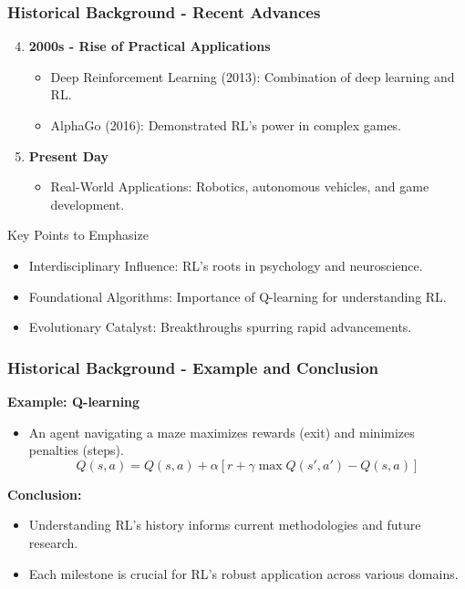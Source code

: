 \documentclass[aspectratio=169]{beamer}
\begin{document}
\begin{frame}[fragile]
    \frametitle{Historical Background - Recent Advances}
    \begin{enumerate}
        \setcounter{enumi}{3}
        \item \textbf{2000s - Rise of Practical Applications}
            \begin{itemize}
                \item Deep Reinforcement Learning (2013): Combination of deep learning and RL.
                \item AlphaGo (2016): Demonstrated RL's power in complex games.
            \end{itemize}
        
        \item \textbf{Present Day}
            \begin{itemize}
                \item Real-World Applications: Robotics, autonomous vehicles, and game development.
            \end{itemize}
    \end{enumerate}
    \begin{block}{Key Points to Emphasize}
        \begin{itemize}
            \item Interdisciplinary Influence: RL's roots in psychology and neuroscience.
            \item Foundational Algorithms: Importance of Q-learning for understanding RL.
            \item Evolutionary Catalyst: Breakthroughs spurring rapid advancements.
        \end{itemize}
    \end{block}
\end{frame}

\begin{frame}[fragile]
    \frametitle{Historical Background - Example and Conclusion}
    \textbf{Example: Q-learning}
    \begin{itemize}
        \item An agent navigating a maze maximizes rewards (exit) and minimizes penalties (steps).
        \begin{equation}
            Q(s, a) = Q(s, a) + \alpha [r + \gamma \max Q(s', a') - Q(s, a)]
        \end{equation}
    \end{itemize}
    \textbf{Conclusion:}
    \begin{itemize}
        \item Understanding RL's history informs current methodologies and future research.
        \item Each milestone is crucial for RL's robust application across various domains.
    \end{itemize}
\end{frame}
\end{document}
